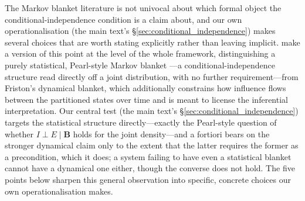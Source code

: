\documentclass[11pt]{article}
\newcommand{\bB}{\boldsymbol{B}}
\begin{document}
The Markov blanket literature is not univocal about which formal object the conditional-independence condition is a claim about, and our own operationalisation (the main text's \S\ref{sec:conditional_independence}) makes several choices that are worth stating explicitly rather than leaving implicit. \citet{Bruineberg2022} make a version of this point at the level of the whole framework, distinguishing a purely statistical, Pearl-style Markov blanket \citep{Pearl1988}---a conditional-independence structure read directly off a joint distribution, with no further requirement---from Friston's dynamical blanket, which additionally constrains how influence flows between the partitioned states over time and is meant to license the inferential interpretation. Our central test (the main text's \S\ref{sec:conditional_independence}) targets the statistical structure directly---exactly the Pearl-style question of whether $I\perp E\mid \bB{}$ holds for the joint density---and a fortiori bears on the stronger dynamical claim only to the extent that the latter requires the former as a precondition, which it does; a system failing to have even a statistical blanket cannot have a dynamical one either, though the converse does not hold. The five points below sharpen this general observation into specific, concrete choices our own operationalisation makes.
\end{document}
